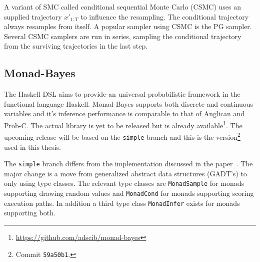 A variant of SMC called conditional sequential Monte Carlo (CSMC) uses an supplied trajectory $x'_{1:T}$ to influence the resampling. The conditional trajectory always resamples from itself. A popular sampler using CSMC is the PG sampler.
Several CSMC samplers are run in series, sampling the conditional trajectory from the surviving trajectories in the last step.

\subsection{Monad-Bayes}
\label{sec:mbayes}

The Haskell DSL aims to provide an universal probabilistic
framework in the functional language Haskell. Monad-Bayes supports both
discrete and continuous variables and it's inference performance is comparable to that of
Anglican and Prob-C. The actual library is yet to be released but is already
available\footnote{\url{https://github.com/adscib/monad-bayes}}. The upcoming release
will be based on the \texttt{simple} branch and this is the
version\footnote{Commit \texttt{59a50b1}.} used in this thesis.

The \texttt{simple} branch differs from the implementation discussed in the
paper~\cite{mbayes}. The major change is a move from generalized abstract data structures
(GADT's) to only using type classes. The relevant type classes are
\texttt{MonadSample} for monads supporting drawing random values and
\texttt{MonadCond} for monads supporting scoring execution paths. In addition a third type class
\texttt{MonadInfer} exists for monads supporting both.

